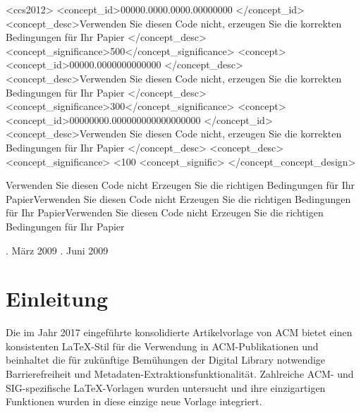 \documentclass[manuscript,screen,review]{acmart}
\begin{document}
\begin{CCSXML}
<ccs2012> <concept_id>00000.0000.0000.00000000 </concept_id> <concept_desc>Verwenden Sie diesen Code nicht, erzeugen Sie die korrekten Bedingungen für Ihr Papier </concept_desc> <concept_significance>500</concept_significance> <concept> <concept_id>00000.0000000000000 </concept_desc> <concept_desc>Verwenden Sie diesen Code nicht, erzeugen Sie die korrekten Bedingungen für Ihr Papier </concept_desc> <concept_significance>300</concept_significance> <concept> <concept_id>00000000.000000000000000000 </concept_id> <concept_desc>Verwenden Sie diesen Code nicht, erzeugen Sie die korrekten Bedingungen für Ihr Papier </concept_desc> <concept_desc> <concept_significance> <100 <concept_signific> </concept_concept_design>
\end{CCSXML}

\ccsdesc[500] \ccsdesc[300]  \ccsdesc[100]

{Verwenden Sie diesen Code nicht Erzeugen Sie die richtigen Bedingungen für Ihr Papier}{Verwenden Sie diesen Code nicht Erzeugen Sie die richtigen Bedingungen für Ihr Papier}{Verwenden Sie diesen Code nicht Erzeugen Sie die richtigen Bedingungen für Ihr Papier}%

 {. März 2009} {. Juni 2009}

\maketitle

\section{Einleitung}
Die im Jahr 2017 eingeführte konsolidierte Artikelvorlage von ACM bietet einen konsistenten \LaTeX-Stil für die Verwendung in ACM-Publikationen und beinhaltet die für zukünftige Bemühungen der Digital Library notwendige Barrierefreiheit und Metadaten-Extraktionsfunktionalität. Zahlreiche ACM- und SIG-spezifische \LaTeX-Vorlagen wurden untersucht und ihre einzigartigen Funktionen wurden in diese einzige neue Vorlage integriert.
\end{document}

